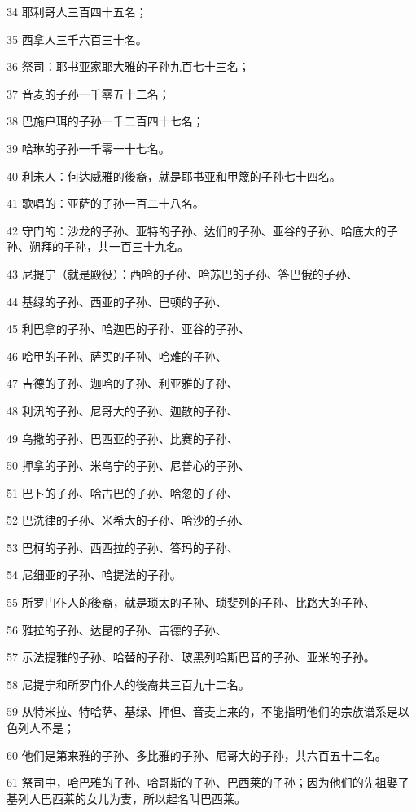 \par 34 耶利哥人三百四十五名；
\par 35 西拿人三千六百三十名。
\par 36 祭司：耶书亚家耶大雅的子孙九百七十三名；
\par 37 音麦的子孙一千零五十二名；
\par 38 巴施户珥的子孙一千二百四十七名；
\par 39 哈琳的子孙一千零一十七名。
\par 40 利未人：何达威雅的後裔，就是耶书亚和甲篾的子孙七十四名。
\par 41 歌唱的：亚萨的子孙一百二十八名。
\par 42 守门的：沙龙的子孙、亚特的子孙、达们的子孙、亚谷的子孙、哈底大的子孙、朔拜的子孙，共一百三十九名。
\par 43 尼提宁（就是殿役）：西哈的子孙、哈苏巴的子孙、答巴俄的子孙、
\par 44 基绿的子孙、西亚的子孙、巴顿的子孙、
\par 45 利巴拿的子孙、哈迦巴的子孙、亚谷的子孙、
\par 46 哈甲的子孙、萨买的子孙、哈难的子孙、
\par 47 吉德的子孙、迦哈的子孙、利亚雅的子孙、
\par 48 利汛的子孙、尼哥大的子孙、迦散的子孙、
\par 49 乌撒的子孙、巴西亚的子孙、比赛的子孙、
\par 50 押拿的子孙、米乌宁的子孙、尼普心的子孙、
\par 51 巴卜的子孙、哈古巴的子孙、哈忽的子孙、
\par 52 巴洗律的子孙、米希大的子孙、哈沙的子孙、
\par 53 巴柯的子孙、西西拉的子孙、答玛的子孙、
\par 54 尼细亚的子孙、哈提法的子孙。
\par 55 所罗门仆人的後裔，就是琐太的子孙、琐斐列的子孙、比路大的子孙、
\par 56 雅拉的子孙、达昆的子孙、吉德的子孙、
\par 57 示法提雅的子孙、哈替的子孙、玻黑列哈斯巴音的子孙、亚米的子孙。
\par 58 尼提宁和所罗门仆人的後裔共三百九十二名。
\par 59 从特米拉、特哈萨、基绿、押但、音麦上来的，不能指明他们的宗族谱系是以色列人不是；
\par 60 他们是第来雅的子孙、多比雅的子孙、尼哥大的子孙，共六百五十二名。
\par 61 祭司中，哈巴雅的子孙、哈哥斯的子孙、巴西莱的子孙；因为他们的先祖娶了基列人巴西莱的女儿为妻，所以起名叫巴西莱。
